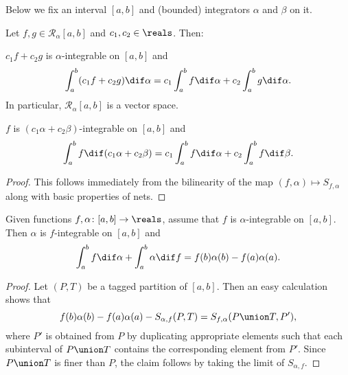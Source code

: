 \documentclass[article, a4paper, 11pt, oneside]{memoir}
\numberwithin{equation}{chapter}
\newcommand{\calR}{\mathcal{R}}
\begin{document}
Below we fix an interval $[a,b]$ and (bounded) integrators $\alpha$ and $\beta$ on it.

\begin{proposition}
    Let $f,g \in \calR_\alpha[a,b]$ and $c_1, c_2 \in \reals$. Then:
    \begin{enumprop}
        \item $c_1 f + c_2 g$ is $\alpha$-integrable on $[a,b]$ and
        \begin{equation*}
            \int_a^b (c_1 f + c_2 g) \dif\alpha
                = c_1 \int_a^b f \dif\alpha + c_2 \int_a^b g \dif\alpha.
        \end{equation*}
        In particular, $\calR_\alpha[a,b]$ is a vector space.

        \item $f$ is $(c_1 \alpha + c_2 \beta)$-integrable on $[a,b]$ and
        \begin{equation*}
            \int_a^b f \dif(c_1 \alpha + c_2 \beta)
                = c_1 \int_a^b f \dif\alpha + c_2 \int_a^b f \dif\beta.
        \end{equation*}
    \end{enumprop}
\end{proposition}

\begin{proof}
    This follows immediately from the bilinearity of the map $(f,\alpha) \mapsto S_{f,\alpha}$ along with basic properties of nets.
\end{proof}


\begin{proposition}
    Given functions $f,\alpha \colon [a,b] \to \reals$, assume that $f$ is $\alpha$-integrable on $[a,b]$. Then $\alpha$ is $f$-integrable on $[a,b]$ and
    \begin{equation*}
        \int_a^b f \dif\alpha + \int_a^b \alpha \dif f
            = f(b)\alpha(b) - f(a)\alpha(a).
    \end{equation*}
\end{proposition}

\begin{proof}
    Let $(P,T)$ be a tagged partition of $[a,b]$. Then an easy calculation shows that
    \begin{equation*}
        f(b)\alpha(b) - f(a)\alpha(a) - S_{\alpha,f}(P,T)
            = S_{f,\alpha}(P \union T, P'),
    \end{equation*}
    where $P'$ is obtained from $P$ by duplicating appropriate elements such that each subinterval of $P \union T$ contains the corresponding element from $P'$. Since $P \union T$ is finer than $P$, the claim follows by taking the limit of $S_{\alpha,f}$.
\end{proof}
\end{document}
